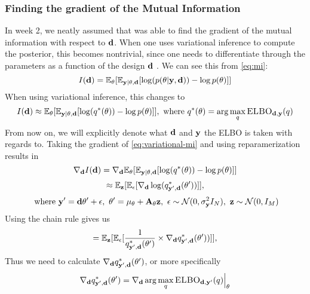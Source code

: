 \subsubsection{Finding the gradient of the Mutual Information}
In week 2, we neatly assumed that  was able to find the gradient 
of the mutual information with respect to $\mathbf{d}$. 
When one uses variational inference to compute the posterior, this becomes nontrivial, since one needs to differentiate through the parameters as a function of the design $\mathbf{d}$ \cite{lorraine19}.
We can see this from \eqref{eq:mi}:
\begin{equation}I(\mathbf{d}) = \mathbb{E}_{\mathbf{\theta}}[\mathbb{E}_{\mathbf{y} | \theta, \mathbf{d}}[\log (p(\theta | \mathbf{y}, \mathbf{d})) - \log p(\theta)]]\end{equation}
When using variational inference, this changes to
\begin{equation}\label{eq:variational-mi}I(\mathbf{d}) \approx \mathbb{E}_{\mathbf{\theta}}[\mathbb{E}_{\mathbf{y}|\theta, \mathbf{d}}[\log (q^*(\theta)) - \log p(\theta)]],\ \textrm{where}\ q^*(\theta) = \arg \max_q \textsc{ELBO}_{\mathbf{d}, \mathbf{y}}(q)\end{equation}
From now on, we will explicitly denote what $\mathbf{d}$ and $\mathbf{y}$ the ELBO is taken with regards to.
Taking the gradient of \eqref{eq:variational-mi} and using reparamerization results in
\begin{equation}\nabla_{\mathbf{d}} I(\mathbf{d}) = \nabla_{\mathbf{d}}\mathbb{E}_{\mathbf{\theta}}[\mathbb{E}_{\mathbf{y} | \theta, \mathbf{d}}[\log (q^*(\theta)) - \log p(\theta)]]\label{eq:var-mi-reparam}\end{equation}
\begin{equation} \approx \mathbb{E}_{\mathbf{z}}[\mathbb{E}_{\mathbf{\epsilon}}[\nabla_{\mathbf{d}}\log (q^*_{\mathbf{y}', \mathbf{d}}(\theta'))]],\label{eq:inner-grad}\end{equation}
$$\ \textrm{where}\ \mathbf{y}' = \mathbf{d}\theta' + \epsilon,\ \theta' = \mu_\theta + \mathbf{A}_\theta\mathbf{z},\ \epsilon \sim \mathcal{N}(0, \sigma^2_{\mathbf{y}} I_N),\ \mathbf{z} \sim \mathcal{N}(0, I_M)$$
Using the chain rule gives us
\begin{equation}
  = \mathbb{E}_{\mathbf{z}}[\mathbb{E}_{\mathbf{\epsilon}}[\frac{1}{q^*_{\mathbf{y}', \mathbf{d}}(\theta')} \times \nabla_{\mathbf{d}} q^*_{\mathbf{y}', \mathbf{d}}(\theta'))]],
  \label{eq:variational-mi-2}
\end{equation}
Thus we need to calculate $\nabla_{\mathbf{d}} q^*_{\mathbf{y}', \mathbf{d}}(\theta')$, or more specifically
\begin{equation}
\nabla_{\mathbf{d}} q^*_{\mathbf{y}', \mathbf{d}}(\theta') = \nabla_{\mathbf{d}} \arg \max_q \textsc{ELBO}_{\mathbf{d}, \mathbf{y}'}(q)\Bigr\rvert_{\theta}
\end{equation}
